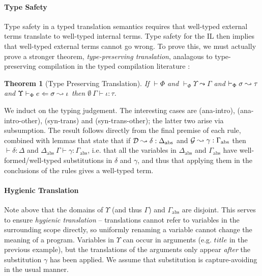 \documentclass[10pt,preprint]{sigplanconf}
\newtheorem{theorem}{Theorem}
\newenvironment{proof-sketch}{\noindent{\emph{Proof Sketch.}}}{\qed}
\begin{document}
\paragraph{Type Safety}
Type safety in a typed translation semantics requires that well-typed external terms translate to well-typed internal terms. Type safety for the IL \cite{pfpl} then implies that well-typed external terms cannot go wrong. To prove this, we must actually prove a stronger theorem, \emph{type-preserving translation}, analagous to type-preserving compilation in the typed compilation literature \cite{tarditi+:til-OLD}:%

\begin{theorem}[Type Preserving Translation]
If $\vdash \Phi$ and $\vdash_\Phi \Upsilon \leadsto \Gamma$ and $\vdash_\Phi \sigma \leadsto \tau$ and $\Upsilon \vdash_{\Phi} e \Leftarrow \sigma \leadsto \iota$ then $\emptyset~\Gamma \vdash \iota : \tau$.
\end{theorem}
\begin{proof-sketch}
We induct on the typing judgement. The interesting cases are (ana-intro), (ana-intro-other), (syn-trans) and (syn-trans-other); the latter two arise via subsumption. The result follows directly from the final premise of each rule, combined with lemmas that state that if $\mathcal{D} \leadsto \delta : \Delta_\text{abs}$ and $\mathcal{G} \leadsto \gamma : \Gamma_\text{abs}$ then $\vdash \delta : \Delta$ and $\Delta_\text{abs}~\Gamma \vdash \gamma : \Gamma_\text{abs}$, i.e. that all the variables in $\Delta_\text{abs}$ and $\Gamma_\text{abs}$ have well-formed/well-typed substitutions in $\delta$ and $\gamma$,  and thus that applying them in the conclusions of the rules gives a well-typed term.
\end{proof-sketch}

\paragraph{Hygienic Translation} 
Note above that the domains of $\Upsilon$ (and thus $\Gamma$)  and $\Gamma_\text{abs}$ are disjoint. This serves to ensure \emph{hygienic translation} -- translations cannot refer to variables in the surrounding scope directly, so uniformly renaming a variable cannot change the meaning of a program. Variables in $\Upsilon$ can  occur in arguments (e.g. $title$ in the previous example), but the translations of the arguments only appear \emph{after} the substitution $\gamma$ has been applied. We assume that substitution is capture-avoiding in the usual manner. %
\end{document}
